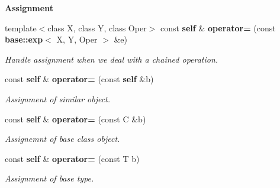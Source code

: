 \begin{Indent}{\bf Assignment}\par
\begin{CompactItemize}
\item 
template$<$class X, class Y, class Oper$>$ const {\bf self} \& {\bf operator=} (const {\bf base::exp}$<$ X, Y, Oper $>$ \&e)
\begin{CompactList}\small\item\em Handle assignment when we deal with a chained operation. \item\end{CompactList}\item 
const {\bf self} \& {\bf operator=} (const {\bf self} \&b)
\begin{CompactList}\small\item\em Assignment of similar object. \item\end{CompactList}\item 
const {\bf self} \& {\bf operator=} (const C \&b)
\begin{CompactList}\small\item\em Assignemnt of base class object. \item\end{CompactList}\item 
const {\bf self} \& {\bf operator=} (const T b)
\begin{CompactList}\small\item\em Assignment of base type. \item\end{CompactList}\end{CompactItemize}
\end{Indent}
